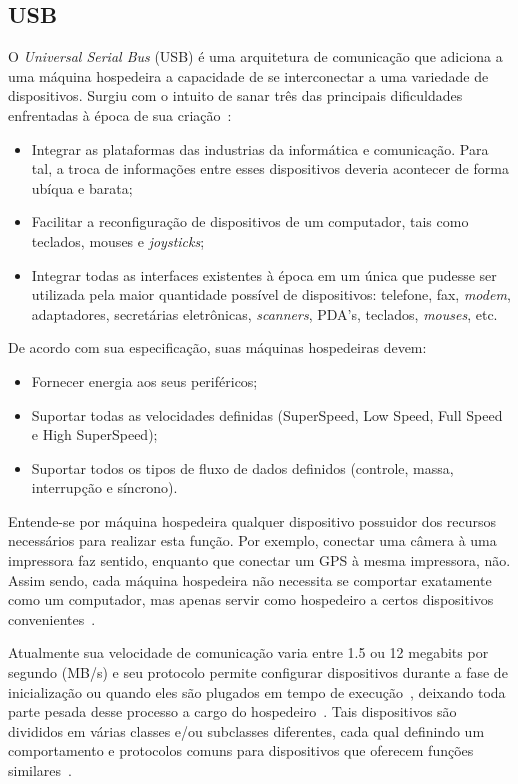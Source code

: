 \subsection{USB}

O \emph{Universal Serial Bus} (USB) é uma arquitetura de comunicação que adiciona a uma máquina hospedeira a capacidade de se interconectar a uma variedade de dispositivos. Surgiu com o intuito de sanar três das principais dificuldades enfrentadas à época de sua criação~\cite{usbspec}:

\begin{itemize}
	\item Integrar as plataformas das industrias da informática e comunicação. Para tal, a troca de informações entre esses dispositivos deveria acontecer de forma ubíqua e barata;
	\item Facilitar a reconfiguração de dispositivos de um computador, tais como teclados, mouses e \emph{joysticks};
	\item Integrar todas as interfaces existentes à época em um única que pudesse ser utilizada pela maior quantidade possível de dispositivos: telefone, fax, \emph{modem}, adaptadores, secretárias eletrônicas, \emph{scanners}, PDA's, teclados, \emph{mouses}, etc.
\end{itemize}

De acordo com sua especificação, suas máquinas hospedeiras devem:

\begin{itemize}
	\item Fornecer energia aos seus periféricos;
	\item Suportar todas as velocidades definidas (SuperSpeed, Low Speed, Full Speed e High SuperSpeed);
	\item Suportar todos os tipos de fluxo de dados definidos (controle, massa, interrupção e síncrono).
\end{itemize}

Entende-se por máquina hospedeira qualquer dispositivo possuidor dos recursos necessários para realizar esta função. Por exemplo, conectar uma câmera à uma impressora faz sentido, enquanto que conectar um GPS à mesma impressora, não. Assim sendo, cada máquina hospedeira não necessita se comportar exatamente como um computador, mas apenas servir como hospedeiro a certos dispositivos convenientes~\cite{usb3spec}.

Atualmente sua velocidade de comunicação varia entre 1.5 ou 12 megabits por segundo (MB/s) e seu protocolo permite configurar dispositivos durante a fase de inicialização ou quando eles são plugados em tempo de execução~\cite{hid}, deixando toda parte pesada desse processo a cargo do hospedeiro~\cite{usb3spec}. Tais dispositivos são divididos em várias classes e/ou subclasses diferentes, cada qual definindo um comportamento e protocolos comuns para dispositivos que oferecem funções similares~\cite{hid}.

